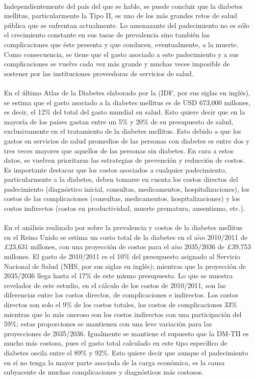 \\
Independientemente del pa\'is del que se hable, se puede concluir que la diabetes mellitus, particularmente la Tipo II, es uno de los m\'as grandes retos de salud p\'ublica que se enfrentan actualmente. Lo amenazante del padecimiento no es s\'olo el crecimiento constante en sus tasas de prevalencia sino tambi\'en las complicaciones que \'este presenta y que conducen, eventualmente, a la muerte. Como consecuencia, se tiene que el gasto asociado a este padecimiento y a sus complicaciones se vuelve cada vez m\'as grande y muchas veces imposible de sostener por las instituciones proveedoras de servicios de salud.\\
\\
En el \'ultimo Atlas de la Diabetes elaborado por la \cite{atlas2015international} (IDF, por sus siglas en ingl\'es), se estima que el gasto asociado a la diabetes mellitus es de USD 673,000 millones, es decir, el 12\% del total del gasto mundial en salud. Esto quiere decir que en la mayor\'ia de los pa\'ises gastan entre un 5\% y 20\% de su presupuesto de salud, exclusivamente en el tratamiento de la diabetes mellitus. Esto debido a que los gastos en servicios de salud promedios de las personas con diabetes es entre dos y tres veces mayores que aquellos de las personas sin diabetes. En cara a estos datos, se vuelven prioritaras las estrategias de prevenci\'on y reducci\'on de costos. Es importante destacar que los costos asociados a cualquier padecimiento, particularmente a la diabetes, deben tomarse en cuenta los costos directos del padecimiento (diagn\'ostico inicial, consultas, medicamentos, hospitalizaciones), los costos de las complicaciones (consultas, medicamentos, hospitalizaciones) y los costos indirectos (costos en productividad, muerte prematura, ausentismo, etc.).\\
\\
En el an\'alisis realizado por \cite{hex2012estimating} sobre la prevalencia y costos de la diabetes mellitus en el Reino Unido se estima un costo total de la diabetes en el a$\tilde{n}$o 2010/2011 de \pounds 23,631 millones, con una proyecci\'on de costos para el a$\tilde{n}$o 2035/2036 de \pounds 39,753 millones. El gasto de 2010/2011 es el 10\% del presupuesto asignado al Servicio Nacional de Salud (NHS, por sus siglas en ingl\'es); mientras que la proyecci\'on de 2035/2036 llega hasta el 17\% de este mismo presupuesto. Lo que se muestra revelador de este estudio, en el c\'alculo de los costos de 2010/2011, son las diferencias entre los costos directos, de complicaciones e indirectos. Los costos directos son solo el 9\% de los costos totales, los costos de complicaciones 33\% mientras que lo m\'as oneroso son los costos indirectos con una participaci\'on del 59\%; estas proporciones se mantienen con una leve variaci\'on para las proyecciones de 2035/2036. Igualmente se mantiene el supuesto que la DM-TII es mucho m\'as costosa, pues el gasto total calculado en este tipo espec\'ifico de diabetes oscila entre el 89\% y 92\%. Esto quiere decir que aunque el padecimiento en sí no tenga la mayor parte asociada de la carga econ\'omica, es la causa subyacente de muchas complicaciones y diagn\'osticos m\'as costosos.\\
